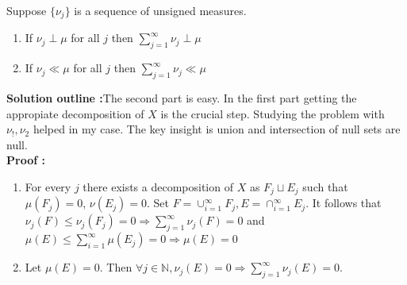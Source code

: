 \documentclass[notoc]{tufte-book}
\begin{document}
\begin{tcolorbox}[colback=c4,colframe=c3,title=Problem 3.9]
	Suppose $\{\nu_j\}$ is a sequence of unsigned measures. 
	\begin{enumerate}
		\item If $\nu_j\perp \mu$ for all $j$ then $\sum_{j=1}^\infty \nu_j\perp \mu$
		\item If $\nu_j\ll \mu$ for all $j$ then $\sum_{j=1}^\infty \nu_j\ll \mu$
	\end{enumerate}
\end{tcolorbox}
\textbf{Solution outline :}The second part is easy. In the first part getting the appropiate decomposition of $X$ is the crucial step. Studying the problem with $\nu_!,\nu_2$ helped in my case. The key insight is union and intersection of null sets are null.\\
\textbf{Proof :}\\
\begin{enumerate}
	\item For every $j$ there exists a decomposition of $X$ as $F_j\sqcup E_j$ such that $\mu(F_j)=0$, $\nu(E_j)=0$. Set $F=\cup_{i=1}^\infty F_j,E=\cap_{i=1}^\infty E_j$. It follows that $\nu_j(F)\leq \nu_j(F_j)=0\Rightarrow\sum_{j=1}^\infty \nu_j(F)=0 $ and $\mu(E)\leq \sum_{i=1}^\infty \mu(E_j)=0\Rightarrow\mu(E)=0$
	\item Let $\mu(E)=0$. Then $\forall j\in\mathbb{N},\nu_j(E)=0\Rightarrow\sum_{j=1}^\infty\nu_j(E)=0$.
\end{enumerate}
\end{document}
